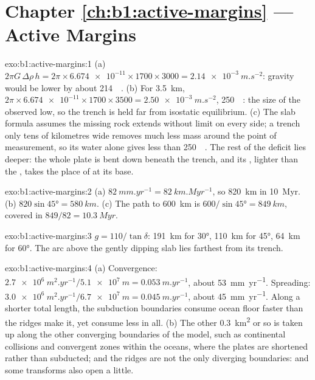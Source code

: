 \section*{Chapter \ref{ch:b1:active-margins} --- Active Margins}

\begin{solution}{exo:b1:active-margins:1}
(a) $2\pi G\,\Delta\rho\,h = 2\pi\times\num{6.674e-11}\times1700\times3000 =
\qty{2.14e-3}{m.s^{-2}}$: gravity would be lower by about
\qty{214}{\milli\gal}. (b) For \qty{3.5}{km},
$2\pi\times\num{6.674e-11}\times1700\times3500 = \qty{2.50e-3}{m.s^{-2}}$,
\qty{250}{\milli\gal}: the size of the observed low, so the trench is held far
from isostatic equilibrium. (c) The slab formula assumes the missing rock
extends without limit on every side; a trench only tens of kilometres wide
removes much less mass around the point of measurement, so its water alone
gives less than \qty{250}{\milli\gal}. The rest of the deficit lies deeper:
the whole plate is bent down beneath the trench, and its , lighter than
the , takes the place of  at its base.
\end{solution}

\begin{solution}{exo:b1:active-margins:2}
(a) $\qty{82}{mm.yr^{-1}} = \qty{82}{km.Myr^{-1}}$, so \qty{820}{km} in
\qty{10}{Myr}. (b) $820\sin\ang{45} = \qty{580}{km}$. (c) The path to
\qty{600}{km} is $600/\sin\ang{45} = \qty{849}{km}$, covered in
$849/82 = \qty{10.3}{Myr}$.
\end{solution}

\begin{solution}{exo:b1:active-margins:3}
$g = 110/\tan\delta$: \qty{191}{km} for \ang{30}, \qty{110}{km} for \ang{45},
\qty{64}{km} for \ang{60}. The arc above the gently dipping slab lies farthest
from its trench.
\end{solution}

\begin{solution}{exo:b1:active-margins:4}
(a) Convergence: $\qty{2.7e6}{m^2.yr^{-1}}/\qty{5.1e7}{m} =
\qty{0.053}{m.yr^{-1}}$, about \qty{53}{mm.yr^{-1}}. Spreading:
$\qty{3.0e6}{m^2.yr^{-1}}/\qty{6.7e7}{m} = \qty{0.045}{m.yr^{-1}}$, about
\qty{45}{mm.yr^{-1}}. Along a shorter total length, the subduction boundaries
consume ocean floor faster than the ridges make it, yet consume less in all.
(b) The other \qty{0.3}{km^2} or so is taken up along the other converging
boundaries of the model, such as continental collisions and convergent zones
within the oceans, where the plates are shortened rather than subducted; and
the ridges are not the only diverging boundaries:  and some
transforms also open a little.
\end{solution}

